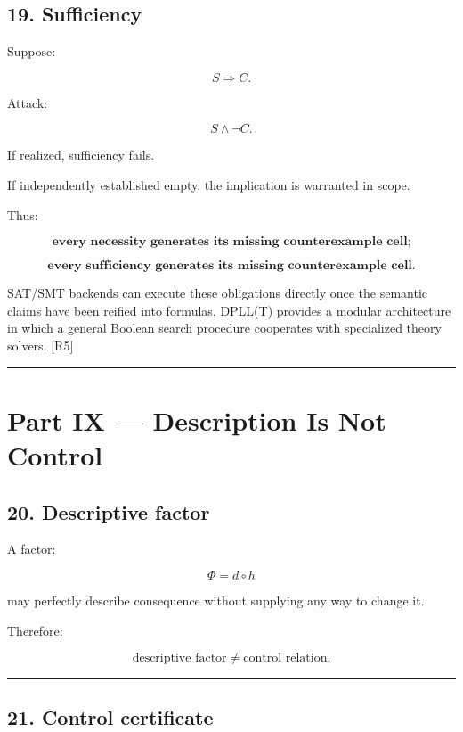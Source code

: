 \documentclass[
]{article}
\begin{document}
\subsection{19. Sufficiency}\label{sufficiency}

Suppose:

\[
S\Rightarrow C.
\]

Attack:

\[
\boxed{
S\land\neg C.
}
\]

If realized, sufficiency fails.

If independently established empty, the implication is warranted in
scope.

Thus:

\[
\boxed{
\textbf{every necessity generates its missing counterexample cell;}
}
\]

\[
\boxed{
\textbf{every sufficiency generates its missing counterexample cell.}
}
\]

SAT/SMT backends can execute these obligations directly once the
semantic claims have been reified into formulas. DPLL(T) provides a
modular architecture in which a general Boolean search procedure
cooperates with specialized theory solvers. {[}R5{]}

\begin{center}\rule{0.5\linewidth}{0.5pt}\end{center}

\section{Part IX --- Description Is Not
Control}\label{part-ix-description-is-not-control}

\subsection{20. Descriptive factor}\label{descriptive-factor}

A factor:

\[
\Phi=d\circ h
\]

may perfectly describe consequence without supplying any way to change
it.

Therefore:

\[
\boxed{
\text{descriptive factor}
\neq
\text{control relation}.
}
\]

\begin{center}\rule{0.5\linewidth}{0.5pt}\end{center}

\subsection{21. Control certificate}\label{control-certificate}
\end{document}

